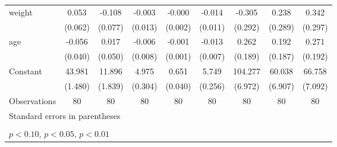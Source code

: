 \begin{table}[htbp]
\begin{tabular}{l*{8}{c}}
\addlinespace
weight              &       0.053         &      -0.108         &      -0.003         &      -0.000         &      -0.014         &      -0.305         &       0.238         &       0.342         \\
                    &     (0.062)         &     (0.077)         &     (0.013)         &     (0.002)         &     (0.011)         &     (0.292)         &     (0.289)         &     (0.297)         \\
\addlinespace
age                 &      -0.056         &       0.017         &      -0.006         &      -0.001         &      -0.013\sym{*}  &       0.262         &       0.192         &       0.271         \\
                    &     (0.040)         &     (0.050)         &     (0.008)         &     (0.001)         &     (0.007)         &     (0.189)         &     (0.187)         &     (0.192)         \\
\addlinespace
Constant            &      43.981\sym{***}&      11.896\sym{***}&       4.975\sym{***}&       0.651\sym{***}&       5.749\sym{***}&     104.277\sym{***}&      60.038\sym{***}&      66.758\sym{***}\\
                    &     (1.480)         &     (1.839)         &     (0.304)         &     (0.040)         &     (0.256)         &     (6.972)         &     (6.907)         &     (7.092)         \\
\midrule
Observations        &          80         &          80         &          80         &          80         &          80         &          80         &          80         &          80         \\
\bottomrule
\multicolumn{9}{l}{\footnotesize Standard errors in parentheses}\\
\multicolumn{9}{l}{\footnotesize  }\\
\multicolumn{9}{l}{\footnotesize \sym{*} \(p<0.10\), \sym{**} \(p<0.05\), \sym{***} \(p<0.01\)}\\
\end{tabular}
\end{table}
